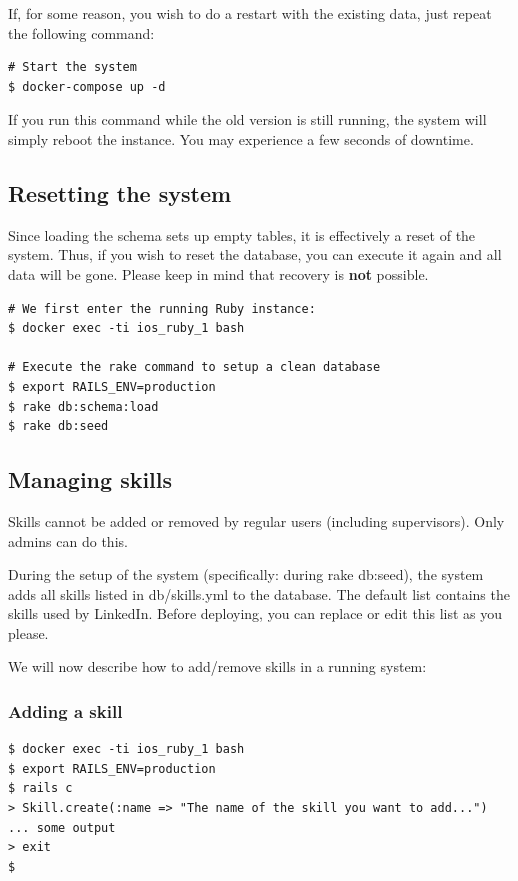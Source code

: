 If, for some reason, you wish to do a restart with the existing data, just repeat the following command:

\begin{verbatim}
# Start the system
$ docker-compose up -d
\end{verbatim}

If you run this command while the old version is still running, the system will simply reboot the instance. You may experience a few seconds of downtime.

\subsection{Resetting the system}
Since loading the schema sets up empty tables, it is effectively a reset of the system. Thus, if you wish to reset the database, you can execute it again and all data will be gone. Please keep in mind that recovery is {\bf not} possible.

\begin{verbatim}
# We first enter the running Ruby instance:
$ docker exec -ti ios_ruby_1 bash

# Execute the rake command to setup a clean database
$ export RAILS_ENV=production
$ rake db:schema:load
$ rake db:seed
\end{verbatim}

\subsection{Managing skills}
Skills cannot be added or removed by regular users (including supervisors). Only admins can do this.

During the setup of the system (specifically: during rake db:seed), the system adds all skills listed in db/skills.yml to the database. The default list contains the skills used by LinkedIn. Before deploying, you can replace or edit this list as you please.

We will now describe how to add/remove skills in a running system:

\subsubsection{Adding a skill}
\begin{verbatim}
$ docker exec -ti ios_ruby_1 bash
$ export RAILS_ENV=production
$ rails c
> Skill.create(:name => "The name of the skill you want to add...")
... some output
> exit
$
\end{verbatim}

